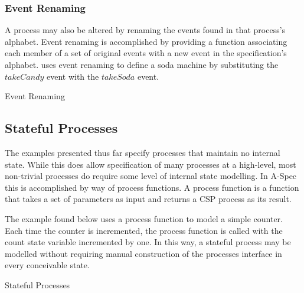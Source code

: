 \documentclass[letterpaper,10pt,draft]{book}
\begin{document}
\subsubsection{Event Renaming}
   \label{sect:EventRenaming}

A process may also be altered by renaming the events found in that process's alphabet.
Event renaming is accomplished by providing a function associating each member of
a set of original events with a new event in the specification's alphabet.  
uses event renaming to define a soda machine by substituting the $takeCandy$ event
with the $takeSoda$ event.

\begin{example}
\begin{minipage}[t]{0.49\linewidth}
   
\end{minipage}
\begin{minipage}[t]{0.49\linewidth}
   \azbox
   
\end{minipage}

   \caption{Event Renaming}
   \label{ex:EvtRen}
\end{example}

\subsection{Stateful Processes}
   \label{sect:StateProc}

The examples presented thus far specify processes that maintain no internal state.
While this does allow specification of many processes at a high-level, most non-trivial
processes do require some level of internal state modelling.  In A-Spec this is
accomplished by way of process functions.  A process function is a function that
takes a set of parameters as input and returns a CSP process as its result.

The example found below uses a process function to model a simple counter.  Each
time the counter is incremented, the process function is called with the count state
variable incremented by one.  In this way, a stateful process may be modelled without
requiring manual construction of the processes interface in every conceivable state.

\begin{example}
\begin{minipage}[t]{0.49\linewidth}
   
\end{minipage}
\begin{minipage}[t]{0.49\linewidth}
   \azbox
   
\end{minipage}

   \caption{Stateful Processes}
   \label{ex:ProcState}
\end{example}
\end{document}
